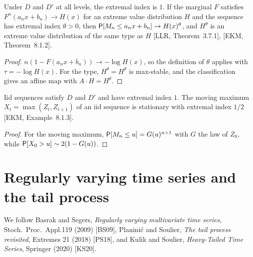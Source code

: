 \begin{theorem}
  \label{thm:stationary-max}
  \leanok
  Under $D$ and $D'$ at all levels, the extremal index is $1$. If the marginal $F$ satisfies
  $F^n(a_n x + b_n) \to H(x)$ for an extreme value distribution $H$ and the sequence has extremal
  index $\theta > 0$, then $\mathsf{P}[M_n \le a_n x + b_n] \to H(x)^\theta$, and $H^\theta$ is an extreme
  value distribution of the same type as $H$ [LLR, Theorem~3.7.1], [EKM, Theorem~8.1.2].
\end{theorem}
\begin{proof}
  \leanok
  $n(1 - F(a_n x + b_n)) \to -\log H(x)$, so the definition of $\theta$ applies with
  $\tau = -\log H(x)$. For the type, $H^\theta = H^{\theta}$ is max-stable, and the
  classification gives an affine map with $A \cdot H = H^\theta$.
\end{proof}

\begin{proposition}[Examples]
  \label{prop:extremal-index-examples}
  \leanok
  Iid sequences satisfy $D$ and $D'$ and have extremal index $1$. The moving maximum
  $X_t = \max(Z_t, Z_{t+1})$ of an iid sequence is stationary with extremal index $1/2$
  [EKM, Example~8.1.3].
\end{proposition}
\begin{proof}
  \leanok
  For the moving maximum, $\mathsf{P}[M_n \le u] = G(u)^{n+1}$ with $G$ the law of $Z_0$, while
  $\mathsf{P}[X_0 > u] \sim 2(1 - G(u))$.
\end{proof}

\section{Regularly varying time series and the tail process}

We follow Basrak and Segers, \emph{Regularly varying multivariate time series}, Stoch.\ Proc.\ Appl.119 (2009) [BS09], Planini\'c and Soulier, \emph{The tail process revisited}, Extremes 21 (2018)
[PS18], and Kulik and Soulier, \emph{Heavy-Tailed Time Series}, Springer (2020) [KS20].

